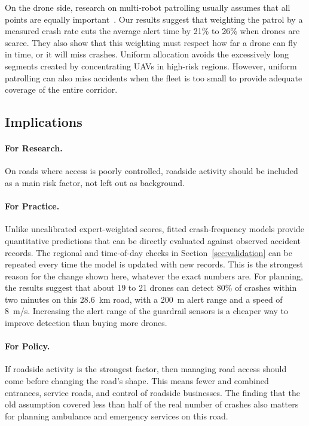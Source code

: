 \documentclass[11pt]{article}
\begin{document}
On the drone side, research on multi-robot patrolling usually assumes that all
points are equally important~\cite{elmaliach2009,portugal2011}. Our results
suggest that weighting the patrol by a measured crash rate cuts the average
alert time by 21\% to 26\% when drones are scarce. They also show that this
weighting must respect how far a drone can fly in time, or it will miss crashes.
Uniform allocation avoids the excessively long
segments created by concentrating UAVs in high-risk
regions. However, uniform patrolling can also miss
accidents when the fleet is too small to provide
adequate coverage of the entire corridor.

\subsection{Implications}

\paragraph{For Research.}
On roads where access is poorly controlled, roadside activity should be
included as a main risk factor, not left out as background.

\paragraph{For Practice.}
Unlike uncalibrated expert-weighted scores, fitted crash-frequency models
provide quantitative predictions that can be directly evaluated against
observed accident records. The regional and time-of-day checks in
Section~\ref{sec:validation} can be repeated every time the model is updated
with new records. This is the
strongest reason for the change shown here, whatever the exact numbers are. For
planning, the results suggest that about 19 to 21 drones can detect 80\% of
crashes within two minutes on this 28.6~km road, with a 200~m alert range and a
speed of 8~m/s. Increasing the alert range of the guardrail sensors is a
cheaper way to improve detection than buying more drones.

\paragraph{For Policy.}
If roadside activity is the strongest factor, then managing road access should
come before changing the road's shape. This means fewer and combined entrances,
service roads, and control of roadside businesses. The finding that the old
assumption covered less than half of the real number of crashes also matters
for planning ambulance and emergency services on this road.
\end{document}
